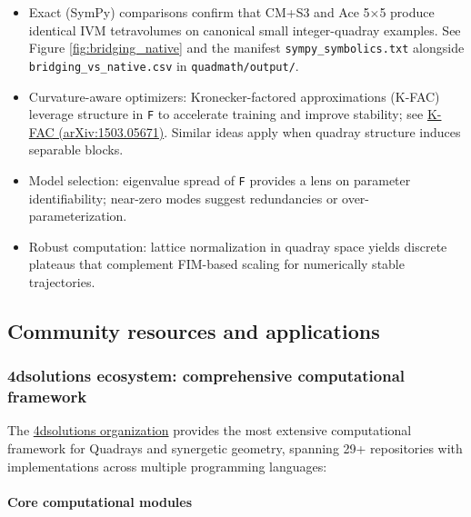 \documentclass[
  10pt,
]{article}
\begin{document}
\begin{itemize}
\item
  Exact (SymPy) comparisons confirm that CM+S3 and Ace 5×5 produce
  identical IVM tetravolumes on canonical small integer-quadray
  examples. See Figure \ref{fig:bridging_native} and the manifest
  \texttt{sympy\_symbolics.txt} alongside
  \texttt{bridging\_vs\_native.csv} in \texttt{quadmath/output/}.
\item
  Curvature-aware optimizers: Kronecker-factored approximations (K-FAC)
  leverage structure in \texttt{F} to accelerate training and improve
  stability; see \href{https://arxiv.org/abs/1503.05671}{K-FAC
  (arXiv:1503.05671)}. Similar ideas apply when quadray structure
  induces separable blocks.
\item
  Model selection: eigenvalue spread of \texttt{F} provides a lens on
  parameter identifiability; near-zero modes suggest redundancies or
  over-parameterization.
\item
  Robust computation: lattice normalization in quadray space yields
  discrete plateaus that complement FIM-based scaling for numerically
  stable trajectories.
\end{itemize}

\hypertarget{community-resources-and-applications}{%
\subsection{Community resources and
applications}\label{community-resources-and-applications}}

\hypertarget{dsolutions-ecosystem-comprehensive-computational-framework}{%
\subsubsection{4dsolutions ecosystem: comprehensive computational
framework}\label{dsolutions-ecosystem-comprehensive-computational-framework}}

The \href{https://github.com/4dsolutions}{4dsolutions organization}
provides the most extensive computational framework for Quadrays and
synergetic geometry, spanning 29+ repositories with implementations
across multiple programming languages:

\hypertarget{core-computational-modules}{%
\paragraph{Core computational
modules}\label{core-computational-modules}}
\end{document}
